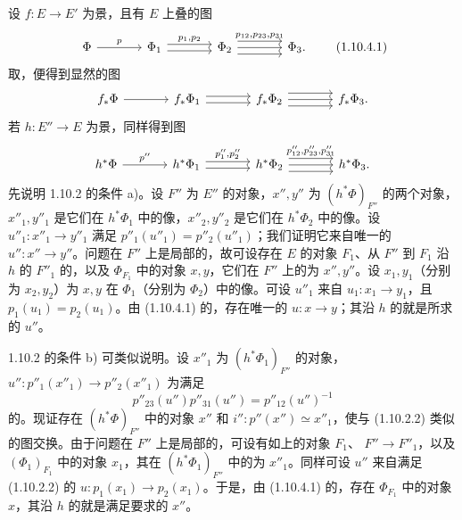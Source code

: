 设 $f:E\to E'$ 为景，且有 $E$ 上叠的图
\[
\begin{tikzcd}[column sep=large]
\Phi\arrow[r,"p"]&\Phi_1\arrow[r,shift left=.6ex,"{p_1,p_2}"]\arrow[r,shift right=.6ex]&\Phi_2\arrow[r,shift left=1.2ex,"{p_{12},p_{23},p_{31}}"]\arrow[r]\arrow[r,shift right=1.2ex]&\Phi_3.
\end{tikzcd}\tag{1.10.4.1}
\]
取，便得到显然的图
\[
\begin{tikzcd}[column sep=large]
f_*\Phi\arrow[r]&f_*\Phi_1\arrow[r,shift left=.6ex]\arrow[r,shift right=.6ex]&f_*\Phi_2\arrow[r,shift left=1.2ex]\arrow[r]\arrow[r,shift right=1.2ex]&f_*\Phi_3.
\end{tikzcd}
\]
若 $h:E''\to E$ 为景，同样得到图
\[
\begin{tikzcd}[column sep=large]
h^*\Phi\arrow[r,"p''"]&h^*\Phi_1\arrow[r,shift left=.6ex,"{p''_1,p''_2}"]\arrow[r,shift right=.6ex]&h^*\Phi_2\arrow[r,shift left=1.2ex,"{p''_{12},p''_{23},p''_{31}}"]\arrow[r]\arrow[r,shift right=1.2ex]&h^*\Phi_3.
\end{tikzcd}
\]
先说明 1.10.2 的条件 a)。设 $F''$ 为 $E''$ 的对象，$x'',y''$ 为 $(h^*\Phi)_{F''}$ 的两个对象，$x''_1,y''_1$ 是它们在 $h^*\Phi_1$ 中的像，$x''_2,y''_2$ 是它们在 $h^*\Phi_2$ 中的像。设 $u''_1:x''_1\to y''_1$ 满足 $p''_1(u''_1)=p''_2(u''_1)$；我们证明它来自唯一的 $u'':x''\to y''$。问题在 $F''$ 上是局部的，故可设存在 $E$ 的对象 $F_1$、从 $F''$ 到 $F_1$ 沿 $h$ 的 $F''_1$ 的，以及 $\Phi_{F_1}$ 中的对象 $x,y$，它们在 $F''$ 上的为 $x'',y''$。设 $x_1,y_1$（分别为 $x_2,y_2$）为 $x,y$ 在 $\Phi_1$（分别为 $\Phi_2$）中的像。可设 $u''_1$ 来自 $u_1:x_1\to y_1$，且 $p_1(u_1)=p_2(u_1)$。由 (1.10.4.1) 的，存在唯一的 $u:x\to y$；其沿 $h$ 的就是所求的 $u''$。

1.10.2 的条件 b) 可类似说明。设 $x''_1$ 为 $(h^*\Phi_1)_{F''}$ 的对象，$u'':p''_1(x''_1)\to p''_2(x''_1)$ 为满足
\[p''_{23}(u'')p''_{31}(u'')=p''_{12}(u'')^{-1}\]
的。现证存在 $(h^*\Phi)_{F''}$ 中的对象 $x''$ 和 $i'':p''(x'')\simeq x''_1$，使与 (1.10.2.2) 类似的图交换。由于问题在 $F''$ 上是局部的，可设有如上的对象 $F_1$、 $F''\to F''_1$，以及 $(\Phi_1)_{F_1}$ 中的对象 $x_1$，其在 $(h^*\Phi_1)_{F''}$ 中的为 $x''_1$。同样可设 $u''$ 来自满足 (1.10.2.2) 的 $u:p_1(x_1)\to p_2(x_1)$。于是，由 (1.10.4.1) 的，存在 $\Phi_{F_1}$ 中的对象 $x$，其沿 $h$ 的就是满足要求的 $x''$。

